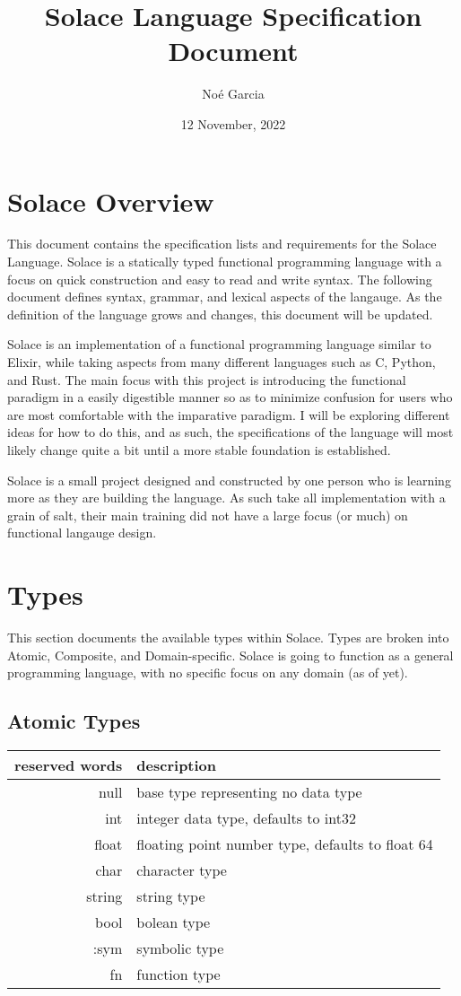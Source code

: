 \documentclass{article}
\title{
	\vspace{2in}
	\textmd{\textbf{Solace Language Specification Document}}
	\vspace{3in}
}
\author{No\'e Garcia}
\date{12 November, 2022}
\begin{document}
\maketitle
\newpage

\section{Solace Overview}
This document contains the specification lists and requirements for the Solace Language.
Solace is a statically typed functional programming language with a focus on quick
construction and easy to read and write syntax. The following document defines syntax,
grammar, and lexical aspects of the langauge. As the definition of the language grows
and changes, this document will be updated.

Solace is an implementation of a functional programming language similar to Elixir,
while taking aspects from many different languages such as C, Python, and Rust.
The main focus with this project is introducing the functional paradigm in a easily
digestible manner so as to minimize confusion for users who are most comfortable with
the imparative paradigm. I will be exploring different ideas for how to do this, and as
such, the specifications of the language will most likely change quite a bit until a more
stable foundation is established.

Solace is a small project designed and constructed by one person who is learning more
as they are building the language. As such take all implementation with a grain of salt,
their main training did not have a large focus (or much) on functional langauge design.


\section{Types}
This section documents the available types within Solace. Types are broken into Atomic,
Composite, and Domain-specific. Solace is going to function as a general programming language,
with no specific focus on any domain (as of yet).

\subsection{Atomic Types}
\begin{tabular}{r|l}
	reserved words & description \\
	\hline
	\hline
	null & base type representing no data type \\
	int & integer data type, defaults to int32 \\
	float & floating point number type, defaults to float 64 \\
	char & character type \\
	string & string type \\
	bool & bolean type \\
	:sym & symbolic type \\
	fn & function type \\
	\hline
\end{tabular}
\end{document}
